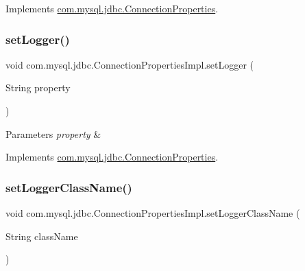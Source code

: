Implements \mbox{\hyperlink{interfacecom_1_1mysql_1_1jdbc_1_1_connection_properties_ae7d48146159a39b7171b4b5a074466c1}{com.\+mysql.\+jdbc.\+Connection\+Properties}}.

\mbox{\label{classcom_1_1mysql_1_1jdbc_1_1_connection_properties_impl_aba563c4b80406355d1d10ac2f9f109f9}} 
\subsubsection{\texorpdfstring{set\+Logger()}{setLogger()}}
{\footnotesize\ttfamily void com.\+mysql.\+jdbc.\+Connection\+Properties\+Impl.\+set\+Logger (\begin{DoxyParamCaption}\item[{String}]{property }\end{DoxyParamCaption})}


\begin{DoxyParams}{Parameters}
{\em property} & \\
\hline
\end{DoxyParams}


Implements \mbox{\hyperlink{interfacecom_1_1mysql_1_1jdbc_1_1_connection_properties_a9ad6baf8983bc1bf352b58b0e1634be1}{com.\+mysql.\+jdbc.\+Connection\+Properties}}.

\mbox{\label{classcom_1_1mysql_1_1jdbc_1_1_connection_properties_impl_ae8b725b385d279e4d89dd6cb2bae641d}} 
\subsubsection{\texorpdfstring{set\+Logger\+Class\+Name()}{setLoggerClassName()}}
{\footnotesize\ttfamily void com.\+mysql.\+jdbc.\+Connection\+Properties\+Impl.\+set\+Logger\+Class\+Name (\begin{DoxyParamCaption}\item[{String}]{class\+Name }\end{DoxyParamCaption})}


